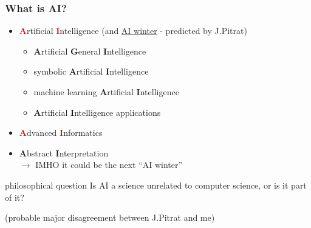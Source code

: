 \documentclass[xcolor=svgnames,final,smaller,a4]{beamer}
\begin{document}
 \begin{frame}
   \frametitle{What is AI?}
   \begin{itemize}
   \item \textcolor{red}{\large \textbf{A}}rtificial
     \textcolor{red}{\large \textbf{I}}ntelligence (and
     \href{https://en.wikipedia.org/wiki/AI_winter}{AI winter} - predicted by J.Pitrat)
     \begin{itemize}
       \item \textbf{A}rtificial \textbf{G}eneral \textbf{I}ntelligence 
       \item symbolic \textbf{A}rtificial \textbf{I}ntelligence
       \item machine learning  \textbf{A}rtificial \textbf{I}ntelligence
       \item\textbf{A}rtificial \textbf{I}ntelligence applications
     \end{itemize}
   \item \textcolor{red}{\large \textbf{A}}dvanced  \textcolor{red}{\large \textbf{I}}nformatics
   \item \textbf{A}bstract \textbf{I}nterpretation {}\\
     $\rightarrow$ IMHO it could be the next ``AI winter''\\
   \end{itemize}


   \bigskip

   \begin{block}{philosophical question}
     Is AI a science unrelated to computer science, or is it part of it?
   \end{block}

   \begin{relsize}{-1.5}
     (probable major disagreement between J.Pitrat and me)
   \end{relsize}
   
 \end{frame}
     
\end{document}
